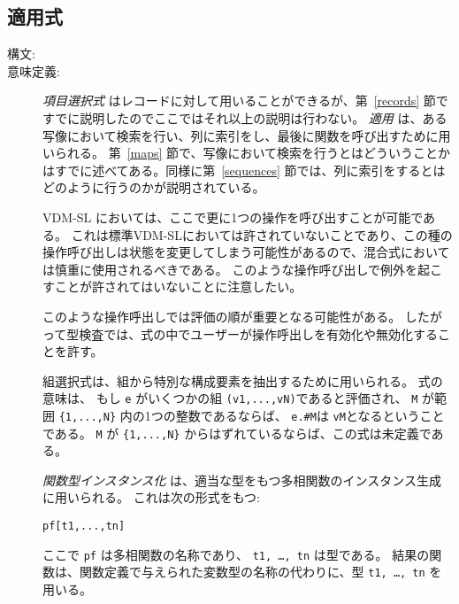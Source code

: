 \documentclass[\pformat,12pt]{jarticle}
\newcommand{\vdmslpp}[2]{%
#1
}
\newcommand{\vdmpp}{VDM++}
\begin{document}
\subsection{適用式}\label{app-expr}

\begin{description}
\item[構文:]





\item[意味定義:] 
  {\it 項目選択式} はレコードに対して用いることができるが、第~\ref{records} 節ですでに説明したのでここではそれ以上の説明は行わない。
 {\it 適用} は、ある写像において検索を行い、列に索引をし、最後に関数を呼び出すために用いられる。
第~\ref{maps} 節で、写像において検索を行うとはどういうことかはすでに述べてある。同様に第~\ref{sequences} 節では、列に索引をするとはどのように行うのかが説明されている。

 \vdmslpp{VDM-SL}{\vdmpp}においては、ここで更に1つの操作を呼び出すことが可能である。
これは標準VDM-SLにおいては許されていないことであり、この種の操作呼び出しは状態を変更してしまう可能性があるので、混合式においては慎重に使用されるべきである。
このような操作呼び出しで例外を起こすことが許されてはいないことに注意したい。

 このような操作呼出しでは評価の順が重要となる可能性がある。
したがって型検査では、式の中でユーザーが操作呼出しを有効化や無効化することを許す。

 組選択式は、組から特別な構成要素を抽出するために用いられる。
式の意味は、 もし \texttt{e} がいくつかの組 \texttt{(v1,...,vN)}であると評価され、 \texttt{M} が範囲 \verb+{1,...,N}+ 内の1つの整数であるならば、 \texttt{e.\#M}は \texttt{vM}となるということである。
\texttt{M} が \verb+{1,...,N}+ からはずれているならば、この式は未定義である。

 {\it 関数型インスタンス化\/} は、適当な型をもつ多相関数のインスタンス生成に用いられる。
これは次の形式をもつ:
  \begin{alltt}
    pf [ t1, ..., tn ]
  \end{alltt}
 ここで {\tt pf} は多相関数の名称であり、 {\tt t1,  \ldots, tn} は型である。
結果の関数は、関数定義で与えられた変数型の名称の代わりに、型 {\tt  t1, \ldots, tn} を用いる。


\end{description}
\end{document}

